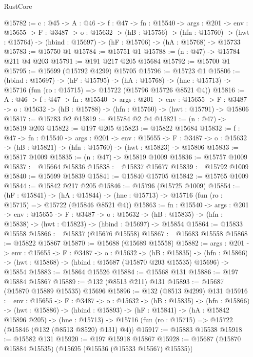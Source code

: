\begin{lexlean}{RustCore}
\begin{coremodule}
@15782 := {c : @45} ->
  {A : @46} ->
  {f : @47} ->
  {fn : @15540} ->
  {args : @201} ->
  {env : @15655} ->
  {F : @3487} ->
  {o : @15632} ->
  (hB : @15756) ->
  (hfn : @15760) -> (hwt : @15764) -> (hbind : @15697) -> (hF : @15706) -> (hA : @15768) -> @15733
@15783 := @15750 @1
@15784 := @15751 @1
@15788 := (n : @47) -> @15784 @211 @4 @203
@15791 := @191 @217 @205 @15684
@15792 := @15700 @1
@15795 := @15699 (@15792 @4299) @15705
@15796 := @15723 @1
@15806 := (hbind : @15697) ->
  (hF : @15795) ->
  (hA : @15768) -> (hne : @15713) -> @15716 (fun (ro : @15715) => @15722 (@15796 @15726 @8521 @4))
@15816 := {A : @46} ->
  {f : @47} ->
  {fn : @15540} ->
  {args : @201} ->
  {env : @15655} ->
  {F : @3487} -> {o : @15632} -> (hB : @15788) -> (hfn : @15760) -> (hwt : @15791) -> @15806
@15817 := @15783 @2
@15819 := @15784 @2 @4
@15821 := (n : @47) -> @15819 @203
@15822 := @197 @205
@15823 := @15822 @15684
@15832 := {f : @47} ->
  {fn : @15540} ->
  {args : @201} ->
  {env : @15655} ->
  {F : @3487} -> {o : @15632} -> (hB : @15821) -> (hfn : @15760) -> (hwt : @15823) -> @15806
@15833 := @15817 @1009
@15835 := (n : @47) -> @15819 @1009
@15836 := @15757 @1009
@15837 := @15664 @15836
@15838 := @15837 @15677
@15839 := @15792 @1009
@15840 := @15699 @15839
@15841 := @15840 @15705
@15842 := @15765 @1009
@15844 := @15842 @217 @205
@15846 := @15796 (@15725 @1009)
@15854 := (hF : @15841) ->
  (hA : @15844) -> (hne : @15713) -> @15716 (fun (ro : @15715) => @15722 (@15846 @8521 @4))
@15863 := {fn : @15540} ->
  {args : @201} ->
  {env : @15655} ->
  {F : @3487} ->
  {o : @15632} -> (hB : @15835) -> (hfn : @15838) -> (hwt : @15823) -> (hbind : @15697) -> @15854
@15864 := @15833 @15558
@15866 := @15837 (@15676 @15558)
@15867 := @15683 @15558
@15868 := @15822 @15867
@15870 := @15688 (@15689 @15558)
@15882 := {args : @201} ->
  {env : @15655} ->
  {F : @3487} ->
  {o : @15632} ->
  (hB : @15835) ->
  (hfn : @15866) -> (hwt : @15868) -> (hbind : @15687 (@15870 @203 @15535) @15696) -> @15854
@15883 := @15864 @15526
@15884 := @15568 @131
@15886 := @197 @15884 @15867
@15889 := @132 (@8513 @211) @131
@15893 := @15687 (@15870 @15889 @15535) @15696
@15896 := @132 (@8513 @4299) @131
@15916 := {env : @15655} ->
  {F : @3487} ->
  {o : @15632} ->
  (hB : @15835) ->
  (hfn : @15866) ->
  (hwt : @15886) ->
  (hbind : @15893) ->
  (hF : @15841) ->
  (hA : @15842 @15896 @205) ->
  (hne : @15713) -> @15716 (fun (ro : @15715) => @15722 (@15846 (@132 (@8513 @8520) @131) @4))
@15917 := @15883 @15538
@15918 := @15582 @131
@15920 := @197 @15918 @15867
@15928 := @15687 (@15870 @15884 @15535) (@15695 (@15536 (@15533 @15567) @15535))

\end{coremodule}
\end{lexlean}
